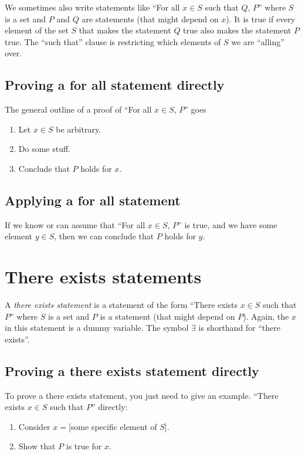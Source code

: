 \documentclass[12pt]{amsart}
\begin{document}
We sometimes also write statements like ``For all $x\in S$ such that $Q$, $P$'' where $S$ is a set and $P$ and $Q$ are statements (that might depend on $x$). It is true if every element of the set $S$ that makes the statement $Q$ true also makes the statement $P$ true. The ``such that'' clause is restricting which elements of $S$ we are ``alling'' over.


\subsection*{Proving a for all statement directly} The general outline of a proof of ``For all $x\in S$, $P$'' goes
\begin{enumerate}
\item Let $x\in S$ be arbitrary.
\item Do some stuff.
\item Conclude that $P$ holds for $x$.
\end{enumerate}




\subsection*{Applying a for all statement} If we know or can assume that ``For all $x\in S$, $P$'' is true, and we have some element $y\in S$, then we can conclude that $P$ holds for $y$.

\section*{There exists statements} A \emph{there exists statement} is a statement of the form ``There exists $x\in S$ such that $P$'' where $S$ is a set and $P$ is a statement (that might depend on $P$). Again, the $x$ in this statement is a dummy variable. The symbol $\exists$ is shorthand for ``there exists''.

\subsection*{Proving a there exists statement directly} To prove a there exists statement, you just need to give an example. ``There exists $x\in S$ such that $P$'' directly:
\begin{enumerate}
\item Consider $x=$[some specific element of $S$].
\item Show that $P$ is true for $x$.
\end{enumerate}
\end{document}
